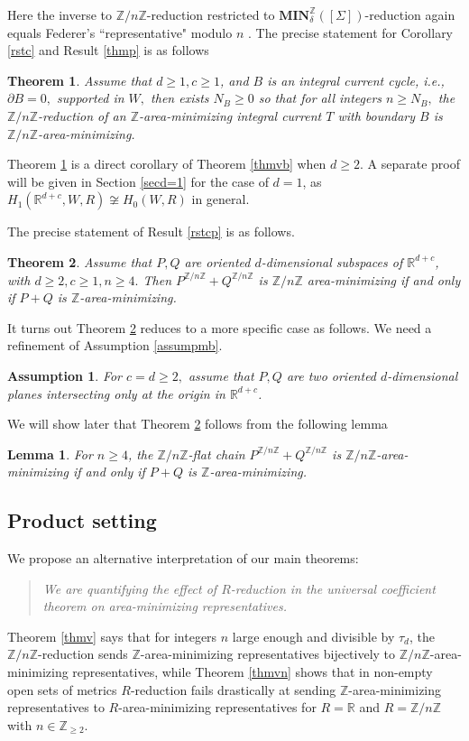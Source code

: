 \documentclass[11pt,a4paper]{amsart}
\numberwithin{equation}{section}
\newcommand{\mn}{\mathbf{MIN}}
\newcommand{\de}{\delta}
\newcommand{\Si}{\Sigma}
\newcommand{\pd}{\partial}
\newcommand{\R}{\mathbb{R}}
\newcommand{\Z}{\mathbb{Z}}
\theoremstyle{plain}
\newtheorem{thm}{Theorem}
\newtheorem{lem}{Lemma}[subsection]
\newtheorem{assump}{Assumption}[subsection]
\theoremstyle{definition}
\numberwithin{equation}{subsection}
\begin{document}
Here the inverse to $\Z/n\Z$-reduction restricted to $\mn_\de^{\Z}\left([\Si]\right)$-reduction again equals Federer's ``representative" modulo $n$ \cite[Section 4.2.26]{HF}. The precise statement for Corollary  \ref{rstc} and Result  \ref{thmp} is as follows
\begin{thm}\label{thmcm}
	Assume that $d\ge 1,c\ge 1$, and $B$ is an integral current cycle, i.e., $\pd B=0,$ supported in $W,$ then exists $N_{B}\ge 0$ so that for all integers $n\ge N_B,$ the $\Z/n\Z$-reduction of an $\Z$-area-minimizing integral current $T$ with boundary $B$  is $\Z/n\Z$-area-minimizing.
\end{thm}
Theorem \ref{thmcm} is a direct corollary of Theorem \ref{thmvb} when $d\ge 2$. A separate proof will be given in Section \ref{secd=1} for the case of $d=1$, as $H_1(\R^{d+c},W,R)\not\cong H_0(W,R)$ in general. 

The precise statement of Result  \ref{rstcp} is as follows. 
\begin{thm}\label{thmcpm}
Assume that $P,Q$ are oriented $d$-dimensional subspaces of $\R^{d+c}$, with $d\ge 2,c\ge 1,n\ge4.$ Then  $P^{\Z/n\Z}+Q^{\Z/n\Z}$ is $\Z/n\Z$ area-minimizing if and only if $P+Q$ is $\Z$-area-minimizing.
\end{thm}
It turns out Theorem \ref{thmcpm} reduces to a more specific case as follows. We need a refinement of Assumption \ref{assumpmb}.
\begin{assump}\label{assumpplane}
	For $c=d\ge 2,$ assume that $P,Q$ are two oriented $d$-dimensional planes intersecting only at the origin in $\R^{d+c}$. 
\end{assump}
We will show later that Theorem  \ref{thmcpm} follows from the following lemma
\begin{lem}\label{lemcpm}
	For $n\ge 4$, the $\Z/n\Z$-flat chain $P^{\Z/n\Z}+Q^{\Z/n\Z}$ is $\Z/n\Z$-area-minimizing if and only if $P+Q$ is $\Z$-area-minimizing.
\end{lem}
	\subsection{Product setting}\label{secprod}
We propose an alternative interpretation of our main theorems:
	\begin{quote}
		\emph{We are quantifying the effect of $R$-reduction in the universal coefficient theorem on area-minimizing representatives.}
	\end{quote} Theorem \ref{thmv} says that for integers $n$ large enough and divisible by $\tau_d$, the $\Z/n\Z$-reduction sends $\Z$-area-minimizing representatives bijectively to $\Z/n\Z$-area-minimizing representatives, while Theorem \ref{thmvn} shows that in non-empty open sets of metrics $R$-reduction fails drastically at sending $\Z$-area-minimizing representatives to $R$-area-minimizing representatives for $R=\R$ and $R=\Z/n\Z$ with $n\in\Z_{\ge 2}.$ 
	
\end{document}
